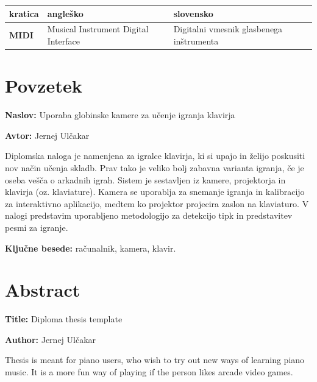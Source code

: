 \documentclass[a4paper,12pt,openright]{book}
\newcommand{\ttitle}{Uporaba globinske kamere za učenje igranja klavirja}
\newcommand{\ttitleEn}{Diploma thesis template}
\newcommand{\tauthor}{Jernej Ulčakar}
\newcommand{\tkeywords}{računalnik, kamera, klavir}
\newcommand{\clearemptydoublepage}{\newpage{\pagestyle{empty}\cleardoublepage}}
\begin{document}
\noindent\begin{tabular}{p{}|p{}|p{}}    %
  {\bf kratica} & {\bf angleško}                              & {\bf slovensko} \\ \hline
  {\bf MIDI}   & Musical Instrument Digital Interface            &Digitalni vmesnik glasbenega inštrumenta \\
\end{tabular}


\clearemptydoublepage

\chapter*{Povzetek}

\noindent\textbf{Naslov:} \ttitle
\bigskip

\noindent\textbf{Avtor:} \tauthor
\bigskip

\noindent Diplomska naloga je namenjena za igralce klavirja, ki si upajo in želijo poskusiti nov način učenja skladb. Prav tako je veliko bolj zabavna varianta igranja, če je oseba vešča o arkadnih igrah. 
Sistem je sestavljen iz kamere, projektorja in klavirja (oz. klaviature). Kamera se uporablja za snemanje igranja in kalibracijo za interaktivno aplikacijo, medtem ko projektor projecira zaslon na klaviaturo. V nalogi predstavim uporabljeno metodologijo za detekcijo tipk in predstavitev pesmi za igranje.


\bigskip

\noindent\textbf{Ključne besede:} \tkeywords.
\clearemptydoublepage

\chapter*{Abstract}

\noindent\textbf{Title:} \ttitleEn
\bigskip

\noindent\textbf{Author:} \tauthor
\bigskip

\noindent Thesis is meant for piano users, who wish to try out new ways of learning piano music. It is a more fun way of playing if the person likes arcade video games.
\end{document}
